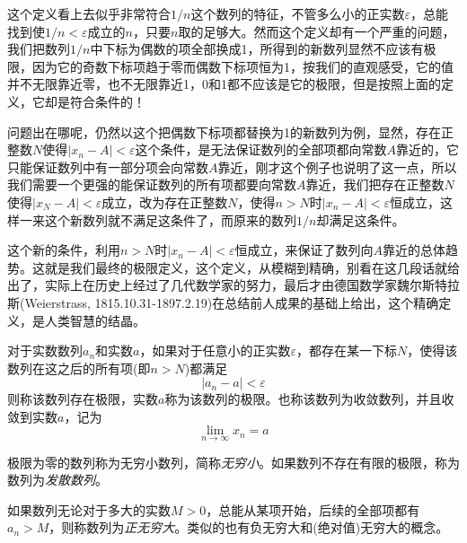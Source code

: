 这个定义看上去似乎非常符合$1/n$这个数列的特征，不管多么小的正实数$\varepsilon$，总能找到使$1/n < \varepsilon$成立的$n$，只要$n$取的足够大。然而这个定义却有一个严重的问题，我们把数列$1/n$中下标为偶数的项全部换成1，所得到的新数列显然不应该有极限，因为它的奇数下标项趋于零而偶数下标项恒为1，按我们的直观感受，它的值并不无限靠近零，也不无限靠近1，0和1都不应该是它的极限，但是按照上面的定义，它却是符合条件的！

问题出在哪呢，仍然以这个把偶数下标项都替换为1的新数列为例，显然，存在正整数$N$使得$|x_n-A|<\varepsilon$这个条件，是无法保证数列的全部项都向常数$A$靠近的，它只能保证数列中有一部分项会向常数$A$靠近，刚才这个例子也说明了这一点，所以我们需要一个更强的能保证数列的所有项都要向常数$A$靠近，我们把存在正整数$N$使得$|x_N-A|<\varepsilon$成立，改为存在正整数$N$，使得$n>N$时$|x_n-A|<\varepsilon$恒成立，这样一来这个新数列就不满足这条件了，而原来的数列$1/n$却满足这条件。

这个新的条件，利用$n>N$时$|x_n-A|<\varepsilon$恒成立，来保证了数列向$A$靠近的总体趋势。这就是我们最终的极限定义，这个定义，从模糊到精确，别看在这几段话就给出了，实际上在历史上经过了几代数学家的努力，最后才由德国数学家魏尔斯特拉斯(Weierstrass, 1815.10.31-1897.2.19)在总结前人成果的基础上给出，这个精确定义，是人类智慧的结晶。

\begin{definition}
  对于实数数列${a_n}$和实数$a$，如果对于任意小的正实数$\varepsilon$，都存在某一下标$N$，使得该数列在这之后的所有项(即$n>N$)都满足
  \begin{equation}
    \label{eq:the-definition-of-sequence-limit}
    |a_n-a|<\varepsilon
  \end{equation}
  则称该数列存在极限，实数$a$称为该数列的极限。也称该数列为收敛数列，并且收敛到实数$a$，记为
  \begin{equation}
    \label{eq:limit-definition-for-number-sequence}
    \lim_{n \to \infty}x_n = a
  \end{equation}
\end{definition}

极限为零的数列称为无穷小数列，简称\emph{无穷小}。如果数列不存在有限的极限，称为数列为\emph{发散数列}。

如果数列无论对于多大的实数$M>0$，总能从某项开始，后续的全部项都有$a_n>M$，则称数列为\emph{正无穷大}。类似的也有负无穷大和(绝对值)无穷大的概念。


